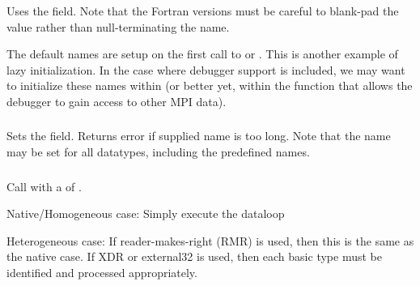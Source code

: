 \documentclass{article}
\begin{document}
\subsubsection{}
Uses the  field.  Note that the Fortran
versions must be careful to 
blank-pad the value rather than null-terminating the name.

The default names are setup on the first call to
 or .  This is another
example of lazy initialization.
In the case where debugger support is included, we may want to
initialize these names within  (or better yet, within
the function that allows the debugger to gain access to other MPI data).




\subsubsection{}
Sets the  field.  Returns error if supplied
name is too long. 
Note that the name may be set for all datatypes, including the predefined
names.

\subsubsection{}
Call  with a  of .
\begin{adi3}
Native/Homogeneous case: Simply execute the dataloop

Heterogeneous case: If reader-makes-right (RMR) is used, then this is the same
as the native case.  If XDR or external32 is used, then each basic type must
be identified and processed appropriately.
\end{adi3}
\end{document}

